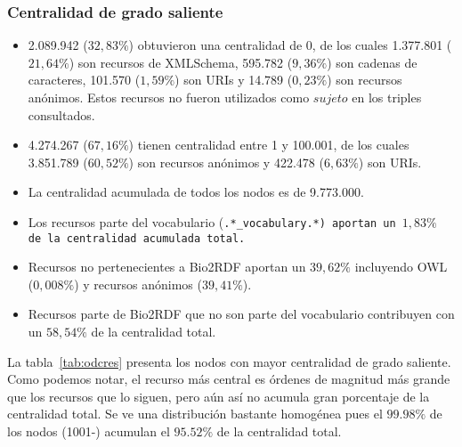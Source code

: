 \subsubsection{Centralidad de grado saliente}
\begin{itemize}
  \item 2.089.942 ($32,83\%$) obtuvieron una centralidad de 0, de los cuales
      1.377.801 ($21,64\%$) son recursos de XMLSchema,
      595.782 ($9,36\%$) son cadenas de caracteres,
      101.570 ($1,59\%$) son URIs y
      14.789 ($0,23\%$) son recursos anónimos.
      Estos recursos no fueron utilizados como $sujeto$ en los triples
      consultados.
  \item
    4.274.267 ($67,16\%$) tienen centralidad entre 1 y 100.001, de los cuales
      3.851.789 ($60,52\%$) son recursos anónimos y
      422.478 ($6,63\%$) son URIs.
  \item La centralidad acumulada de todos los nodos es de 9.773.000.
  \item 
    Los recursos parte del vocabulario (\tt{.*\_vocabulary.*}) aportan un 
    $1,83\%$ de la centralidad acumulada total.
  \item
    Recursos no pertenecientes a Bio2RDF aportan un $39,62\%$ incluyendo OWL 
    ($0,008\%$) y recursos anónimos ($39,41\%$).
  \item 
    Recursos parte de Bio2RDF que no son parte del vocabulario contribuyen con
    un $58,54\%$ de la centralidad total.
\end{itemize}

La tabla~\ref{tab:odcres} presenta los nodos con mayor centralidad de grado
saliente.
Como podemos notar, el recurso más central es órdenes de magnitud más grande
que los recursos que lo siguen, pero aún así no acumula gran porcentaje de la
centralidad total.
Se ve una distribución bastante homogénea pues el $99.98\%$ de los nodos (1001-)
acumulan el $95.52\%$ de la centralidad total.

